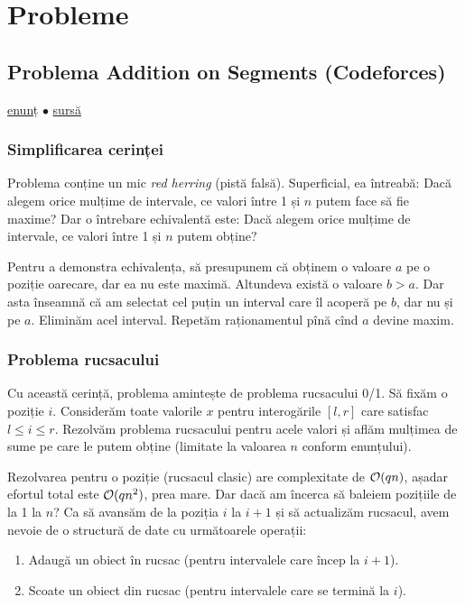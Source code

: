 \documentclass[../main.tex]{subfiles}
\begin{document}
\section{Probleme}

\subsection{Problema Addition on Segments (Codeforces)}
\label{problem:addition-on-segments}

\href{https://codeforces.com/contest/981/problem/E}{enunț}
$\bullet$
\hyperref[code:addition-on-segments]{sursă}

\subsubsection*{Simplificarea cerinței}

Problema conține un mic \textit{red herring} (pistă falsă). Superficial, ea întreabă: Dacă alegem orice mulțime de intervale, ce valori între 1 și $n$ putem face să fie maxime? Dar o întrebare echivalentă este: Dacă alegem orice mulțime de intervale, ce valori între 1 și $n$ putem obține?

Pentru a demonstra echivalența, să presupunem că obținem o valoare $a$ pe o poziție oarecare, dar ea nu este maximă. Altundeva există o valoare $b>a$. Dar asta înseamnă că am selectat cel puțin un interval care îl acoperă pe $b$, dar nu și pe $a$. Eliminăm acel interval. Repetăm raționamentul pînă cînd $a$ devine maxim.

\subsubsection*{Problema rucsacului}

Cu această cerință, problema amintește de problema rucsacului 0/1. Să fixăm o poziție $i$. Considerăm toate valorile $x$ pentru interogările $[l,r]$ care satisfac $l \leq i \leq r$. Rezolvăm problema rucsacului pentru acele valori și aflăm mulțimea de sume pe care le putem obține (limitate la valoarea $n$ conform enunțului).

Rezolvarea pentru o poziție (rucsacul clasic) are complexitate de $\mathcal{O}(qn)$, așadar efortul total este $\mathcal{O}(qn^2)$, prea mare. Dar dacă am încerca să baleiem pozițiile de la 1 la $n$? Ca să avansăm de la poziția $i$ la $i+1$ și să actualizăm rucsacul, avem nevoie de o structură de date cu următoarele operații:

\begin{enumerate}
  \item Adaugă un obiect în rucsac (pentru intervalele care încep la $i+1$).
  \item Scoate un obiect din rucsac (pentru intervalele care se termină la $i$).
\end{enumerate}
\end{document}
